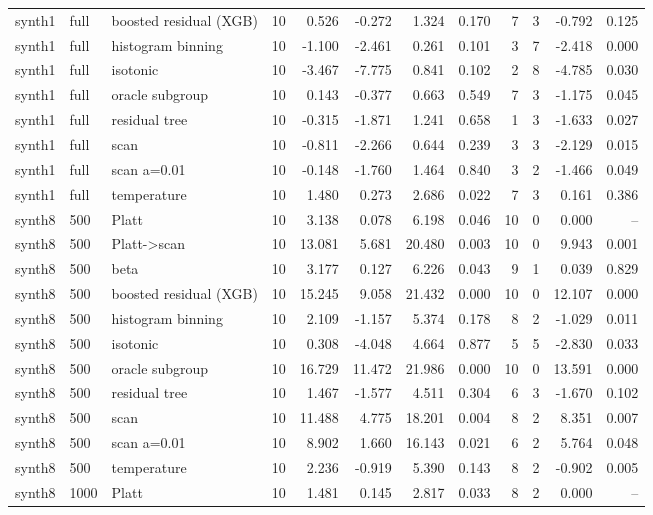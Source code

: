 \begin{tabular}{lllrrrrrrrrr}
synth1 & full & boosted residual (XGB) & 10 & 0.526 & -0.272 & 1.324 & 0.170 & 7 & 3 & -0.792 & 0.125 \\
synth1 & full & histogram binning & 10 & -1.100 & -2.461 & 0.261 & 0.101 & 3 & 7 & -2.418 & 0.000 \\
synth1 & full & isotonic & 10 & -3.467 & -7.775 & 0.841 & 0.102 & 2 & 8 & -4.785 & 0.030 \\
synth1 & full & oracle subgroup & 10 & 0.143 & -0.377 & 0.663 & 0.549 & 7 & 3 & -1.175 & 0.045 \\
synth1 & full & residual tree & 10 & -0.315 & -1.871 & 1.241 & 0.658 & 1 & 3 & -1.633 & 0.027 \\
synth1 & full & scan & 10 & -0.811 & -2.266 & 0.644 & 0.239 & 3 & 3 & -2.129 & 0.015 \\
synth1 & full & scan a=0.01 & 10 & -0.148 & -1.760 & 1.464 & 0.840 & 3 & 2 & -1.466 & 0.049 \\
synth1 & full & temperature & 10 & 1.480 & 0.273 & 2.686 & 0.022 & 7 & 3 & 0.161 & 0.386 \\
synth8 & 500 & Platt & 10 & 3.138 & 0.078 & 6.198 & 0.046 & 10 & 0 & 0.000 & -- \\
synth8 & 500 & Platt->scan & 10 & 13.081 & 5.681 & 20.480 & 0.003 & 10 & 0 & 9.943 & 0.001 \\
synth8 & 500 & beta & 10 & 3.177 & 0.127 & 6.226 & 0.043 & 9 & 1 & 0.039 & 0.829 \\
synth8 & 500 & boosted residual (XGB) & 10 & 15.245 & 9.058 & 21.432 & 0.000 & 10 & 0 & 12.107 & 0.000 \\
synth8 & 500 & histogram binning & 10 & 2.109 & -1.157 & 5.374 & 0.178 & 8 & 2 & -1.029 & 0.011 \\
synth8 & 500 & isotonic & 10 & 0.308 & -4.048 & 4.664 & 0.877 & 5 & 5 & -2.830 & 0.033 \\
synth8 & 500 & oracle subgroup & 10 & 16.729 & 11.472 & 21.986 & 0.000 & 10 & 0 & 13.591 & 0.000 \\
synth8 & 500 & residual tree & 10 & 1.467 & -1.577 & 4.511 & 0.304 & 6 & 3 & -1.670 & 0.102 \\
synth8 & 500 & scan & 10 & 11.488 & 4.775 & 18.201 & 0.004 & 8 & 2 & 8.351 & 0.007 \\
synth8 & 500 & scan a=0.01 & 10 & 8.902 & 1.660 & 16.143 & 0.021 & 6 & 2 & 5.764 & 0.048 \\
synth8 & 500 & temperature & 10 & 2.236 & -0.919 & 5.390 & 0.143 & 8 & 2 & -0.902 & 0.005 \\
synth8 & 1000 & Platt & 10 & 1.481 & 0.145 & 2.817 & 0.033 & 8 & 2 & 0.000 & -- \\

\end{tabular}
